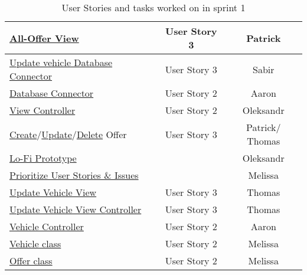\begin{table}[h]
    \centering
    \caption{\label{tab:user-stories-sprint-1}User Stories and tasks worked on in sprint 1}
\begin{tabular}{|l|c|c|}
	\hline
	\href{https://gitlab.rz.uni-bamberg.de/swt/teaching/2021-ws/swt-swl-b/group-a/-/issues/28}{All-Offer View} & User Story 3 & Patrick \\
	\hline
	\href{https://gitlab.rz.uni-bamberg.de/swt/teaching/2021-ws/swt-swl-b/group-a/-/issues/27}{Update vehicle Database Connector} & User Story 3 & Sabir \\
	\hline
	\href{https://gitlab.rz.uni-bamberg.de/swt/teaching/2021-ws/swt-swl-b/group-a/-/issues/24}{Database Connector} & User Story 2 & Aaron \\
	\hline
	\href{https://gitlab.rz.uni-bamberg.de/swt/teaching/2021-ws/swt-swl-b/group-a/-/issues/23}{View Controller} & User Story 2 & Oleksandr \\
	\hline
	\href{https://gitlab.rz.uni-bamberg.de/swt/teaching/2021-ws/swt-swl-b/group-a/-/issues/41}{Create}/\href{https://gitlab.rz.uni-bamberg.de/swt/teaching/2021-ws/swt-swl-b/group-a/-/issues/34}{Update}/\href{https://gitlab.rz.uni-bamberg.de/swt/teaching/2021-ws/swt-swl-b/group-a/-/issues/35}{Delete} Offer & User Story 3 & Patrick/ Thomas \\
	\hline
	\href{https://gitlab.rz.uni-bamberg.de/swt/teaching/2021-ws/swt-swl-b/group-a/-/issues/37}{Lo-Fi Prototype} &  & Oleksandr \\
	\hline
	\href{https://gitlab.rz.uni-bamberg.de/swt/teaching/2021-ws/swt-swl-b/group-a/-/issues/19}{Prioritize User Stories \& Issues} &  & Melissa \\
	\hline
	\href{https://gitlab.rz.uni-bamberg.de/swt/teaching/2021-ws/swt-swl-b/group-a/-/issues/25}{Update Vehicle View} & User Story 3 & Thomas \\
	\hline
	\href{https://gitlab.rz.uni-bamberg.de/swt/teaching/2021-ws/swt-swl-b/group-a/-/issues/26}{Update Vehicle View Controller} & User Story 3 & Thomas \\
	\hline
	\href{https://gitlab.rz.uni-bamberg.de/swt/teaching/2021-ws/swt-swl-b/group-a/-/issues/21}{Vehicle Controller} & User Story 2 & Aaron \\
	\hline
	\href{https://gitlab.rz.uni-bamberg.de/swt/teaching/2021-ws/swt-swl-b/group-a/-/issues/20}{Vehicle class} & User Story 2 & Melissa \\
	\hline
	\href{https://gitlab.rz.uni-bamberg.de/swt/teaching/2021-ws/swt-swl-b/group-a/-/issues/30}{Offer class} & User Story 2 & Melissa \\

\end{tabular}
\end{table}
